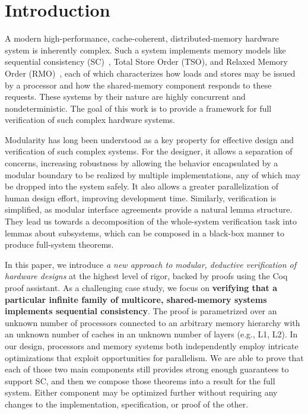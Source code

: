 \section{Introduction}
\label{sec:Introduction}

A modern high-performance, cache-coherent, distributed-memory hardware system
is inherently complex. Such a system implements memory models like sequential
consistency (SC)~\cite{lamport1979make}, Total Store Order (TSO), and Relaxed
Memory Order (RMO)~\cite{weaver1994sparc}, each of which characterizes how
loads and stores may be issued by a processor and how the shared-memory
component responds to these requests.  These systems by their nature are highly
concurrent and nondeterministic.  The goal of this work is to provide a
framework for full verification of such complex hardware systems.  

Modularity has long been understood as a key property for effective design and
verification of such complex systems. For the designer, it allows a separation
of concerns, increasing robustness by allowing the behavior encapsulated by a
modular boundary to be realized by multiple implementations, any of which may
be dropped into the system safely. It also allows a greater parallelization of
human design effort, improving development time. Similarly, verification is
simplified, as modular interface agreements provide a natural lemma structure.
They lead us towards a decomposition of the whole-system verification task
into lemmas about subsystems, which can be composed in a black-box manner to
produce full-system theorems.

In this paper, we introduce \emph{a new approach to modular, deductive
verification of hardware designs} at the highest level of rigor, backed by
proofs using the Coq proof assistant.  As a challenging case study, we focus on
\textbf{verifying that a particular infinite family of multicore, shared-memory
systems implements sequential consistency}.  The proof is parametrized over an
unknown number of processors connected to an arbitrary memory hierarchy with an
unknown number of caches in an unknown number of layers (e.g., L1, L2).  In our
design, processors and memory systems both independently employ intricate
optimizations that exploit opportunities for parallelism.  We are able to prove
that each of those two main components still provides strong enough guarantees
to support SC, and then we compose those theorems into a result for the full
system.  Either component may be optimized further without requiring any
changes to the implementation, specification, or proof of the other.

